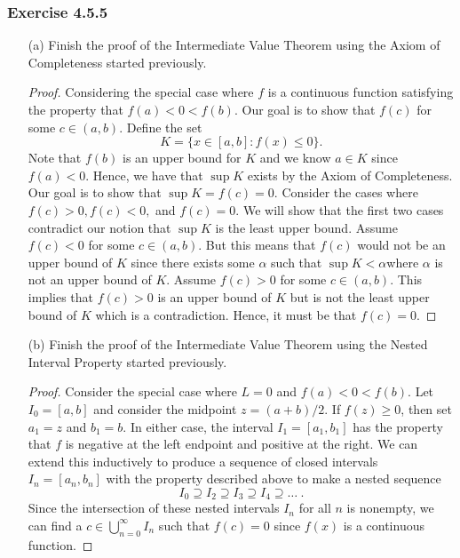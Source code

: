 \subsubsection{Exercise 4.5.5} 
\begin{enumerate}
    \item[(a)] Finish the proof of the Intermediate Value Theorem using the Axiom of Completeness started previously.
        \begin{proof}
        Considering the special case where \( f  \) is a continuous function satisfying the property that \( f(a) < 0 < f(b) \). Our goal is to show that \( f(c) \) for some \( c \in (a,b) \). Define the set 
        \[ K = \{ x \in [a,b] : f(x) \leq 0  \}. \] 
Note that \( f(b)  \) is an upper bound for \(  K \) and we know \( a \in K  \) since \( f(a) < 0  \). Hence, we have that \( \sup K  \) exists by the Axiom of Completeness. Our goal is to show that \( \sup  K = f(c) = 0  \). Consider the cases where \( f(c) > 0 , f(c) < 0,  \) and \( f(c) = 0  \). We will show that the first two cases contradict our notion that \( \sup K  \) is the least upper bound. Assume \( f(c) < 0  \) for some \( c \in (a,b) \). But this means that \( f(c)  \) would not be an upper bound of \(  K \) since there exists some \( \alpha  \) such that \( \sup K < \alpha  \)where \( \alpha  \) is not an upper bound of \( K  \). Assume \( f(c) > 0  \) for some \( c \in (a,b)  \). This implies that \( f(c) > 0  \) is an upper bound of \( K  \) but is not the least upper bound of \( K  \) which is a contradiction. Hence, it must be that \( f(c) = 0  \). 
        \end{proof}
    \item[(b)] Finish the proof of the Intermediate Value Theorem using the Nested Interval Property started previously.
        \begin{proof}
            Consider the special case where \( L = 0  \) and \( f(a) < 0 < f(b)  \). Let \( I_0 = [a,b] \) and consider the midpoint \( z = (a+b) / 2  \). If \( f(z) \geq 0  \), then set \( a_1 = z  \) and \( b_1 = b  \). In either case, the interval \( I_1 = [a_1, b_1 ] \) has the property that \( f  \) is negative at the left endpoint and positive at the right. We can extend this inductively to produce a sequence of closed intervals \( I_n = [a_n, b_n] \) with the property described above to make a nested sequence 
            \[  I_0 \supseteq I_2 \supseteq I_3 \supseteq I_4 \supseteq \dots ~ . \]
            Since the intersection of these nested intervals \( I_n  \) for all \( n \) is nonempty, we can find a \( c \in \bigcup_{n = 0 }^{\infty} I_n \) such that \( f(c) = 0  \) since \( f(x)  \) is a continuous function.
        \end{proof}
\end{enumerate}


